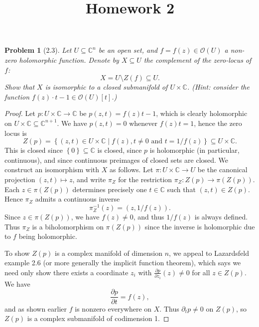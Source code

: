 \documentclass[11pt, letterpaper]{article}
\title{Homework 2}
\theoremstyle{plain}
\newtheorem{problem}{Problem}
\begin{document}
\makeproblem

\begin{problem}[2.3]
	Let $U\subseteq \mathbb{C} ^n$ be an open set, and $f=f(z)\in \mathcal{O} (U)$ a non-zero holomorphic function. Denote by $X\subseteq U$ the complement of the zero-locus of $f$:
	\[
		X=U\setminus Z(f)\subseteq U
	.\]
	Show that $X$ is isomorphic to a closed submanifold of $U\times \mathbb{C} $. (Hint: consider the function $f(z)\cdot t-1\in \mathcal{O} (U)[t]$.)
\end{problem}
\begin{proof}
	Let $p : U\times \mathbb{C}  \to \mathbb{C} $ be $p(z,t)=f(z)t-1$, which is clearly holomorphic on $U\times \mathbb{C} \subseteq \mathbb{C} ^{n+1} $. We have $p(z,t)=0$ whenever $f(z)t=1$, hence the zero locus is
	\[
		Z(p)=\left\{ (z,t)\in U\times \mathbb{C} \mid f(z),t\neq 0 \text{ and } t = 1/f(z) \right\} \subseteq U\times \mathbb{C} 
	.\]
	This is closed since $\left\{ 0 \right\} \subseteq \mathbb{C} $ is closed, since $p$ is holomorphic (in particular, continuous), and since continuous preimages of closed sets are closed. We construct an isomorphism with $X$ as follows. Let $\pi : U\times \mathbb{C}  \to U$ be the canonical projection $(z,t)\mapsto z$, and write $\pi_Z$ for the restriction $\pi_Z : Z(p) \to \pi (Z(p))$. Each $z\in \pi (Z(p))$ determines precisely one $t\in\mathbb{C} $ such that $(z,t)\in Z(p)$. Hence $\pi _Z$ admits a continuous inverse
	\[
		\pi_Z^{-1} (z) = (z,1/f(z))
	.\]
	Since $z\in \pi (Z(p))$, we have $f(z) \neq 0$, and thus $1/f(z)$ is always defined. Thus $\pi _Z$ is a biholomorphism on $\pi (Z(p))$ since the inverse is holomorphic due to $f$ being holomorphic.

	To show $Z(p)$ is a complex manifold of dimension $n$, we appeal to Lazardsfeld example 2.6 (or more generally the implicit function theorem), which says we need only show there exists a coordinate $z_i$ with $\frac{\partial p}{\partial z_i}(z) \neq 0$ for all $z\in Z(p)$. We have
	\[
		\frac{\partial p}{\partial t} =f(z),
	\]
	and as shown earlier $f$ is nonzero everywhere on $X$. Thus $\partial _tp \neq 0$ on $Z(p)$, so $Z(p)$ is a complex submanifold of codimension 1.
\end{proof}
\end{document}
